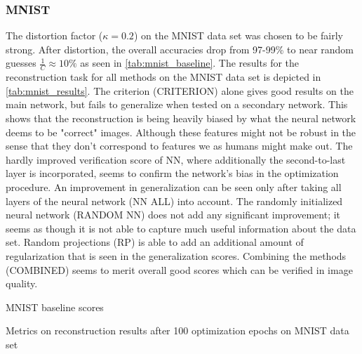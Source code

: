 \subsubsection{MNIST}


The distortion factor ($\kappa = 0.2$) on the MNIST data set was chosen to be fairly strong.
After distortion, the overall accuracies drop from 97-99\% to near random guesses $\frac 1 C \approx 10\%$
as seen in \cref{tab:mnist_baseline}.
The results for the reconstruction task for all methods on the MNIST data set is depicted in \cref{tab:mnist_results}.
The criterion (CRITERION) alone gives good results on the main network, but fails to generalize when tested on a secondary network.
This shows that the reconstruction is being heavily biased by what the neural network deems to be "correct" images. Although these features might not be robust in the sense that they don't correspond to features we as humans might make out.
The hardly improved verification score of NN, where additionally the second-to-last layer is 
incorporated, seems to confirm
the network's bias in the optimization procedure. 
An improvement in generalization can be seen only after taking 
all layers of the neural network (NN ALL) into account.
The randomly initialized neural network (RANDOM NN) does not add any significant improvement; 
it seems as though it is not able to capture much useful information about the data set.
Random projections (RP) is able to add an additional amount of regularization that is seen in the generalization scores.
Combining the methods (COMBINED) seems to merit overall good scores which can be verified in image quality.


\begin{table}[!htbp]
\centering
\footnotesize
{}
\caption{MNIST baseline scores}
\label{tab:mnist_baseline}
\end{table}

\begin{table}[!htbp]
\centering
\footnotesize
{}
\caption{Metrics on reconstruction results after 100 optimization epochs on MNIST data set}
\label{tab:mnist_results}
\end{table}


